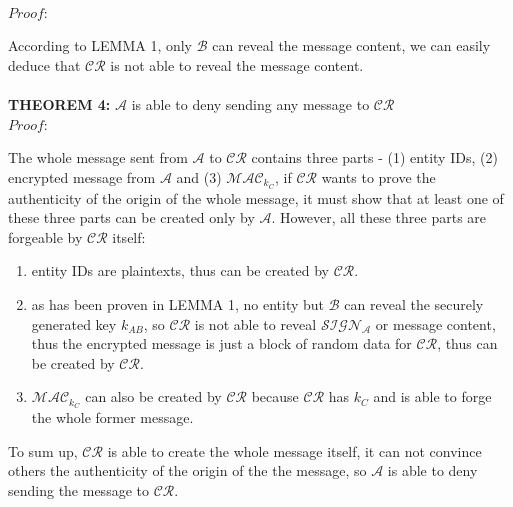 \documentclass[10pt,a4paper]{article}
\begin{document}
\\
\emph{$Proof:$} \par
According to LEMMA 1, only $\mathcal{B}$ can reveal the message content, we can easily deduce that $\mathcal{CR}$ is not able to reveal the message content.
\\
\\
\textbf{THEOREM 4:} $\mathcal{A}$ is able to deny sending any message to $\mathcal{CR}$
\\
\emph{$Proof:$} \par
The whole message sent from $\mathcal{A}$ to $\mathcal{CR}$ contains three parts - (1) entity IDs, (2) encrypted message from $\mathcal{A}$ and (3) $\mathcal{MAC}_{k_C}$, if $\mathcal{CR}$ wants to prove the authenticity of the origin of the whole message, it must show that at least one of these three parts can be created only by $\mathcal{A}$. However, all these three parts are forgeable by $\mathcal{CR}$ itself:
\begin{enumerate}
\item entity IDs are plaintexts, thus can be created by $\mathcal{CR}$.
\item as has been proven in LEMMA 1, no entity but $\mathcal{B}$ can reveal the securely generated key $k_{AB}$, so $\mathcal{CR}$ is not able to reveal $\mathcal{SIGN_A}$ or message content, thus the encrypted message is just a block of random data for $\mathcal{CR}$, thus can be created by $\mathcal{CR}$.
\item $\mathcal{MAC}_{k_C}$ can also be created by $\mathcal{CR}$ because $\mathcal{CR}$ has $k_C$ and is able to forge the whole former message.
\end{enumerate}
To sum up, $\mathcal{CR}$ is able to create the whole message itself, it can not convince others the authenticity of the origin of the the message, so $\mathcal{A}$ is able to deny sending the message to $\mathcal{CR}$.
\end{document}
